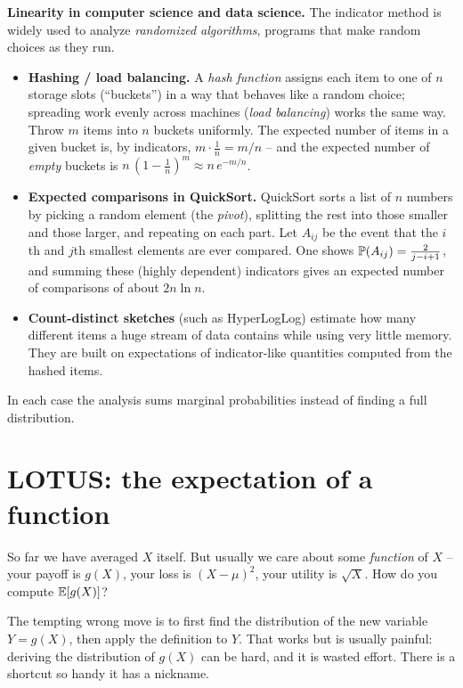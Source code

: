 \begin{applicationbox}
\textbf{Linearity in computer science and data science.} The indicator method is
widely used to analyze \emph{randomized algorithms}, programs that make random
choices as they run.
\begin{itemize}
  \item \textbf{Hashing / load balancing.} A \emph{hash function} assigns each
  item to one of $n$ storage slots (``buckets'') in a way that behaves like a
  random choice; spreading work evenly across machines (\emph{load balancing})
  works the same way. Throw $m$ items into $n$ buckets
  uniformly. The expected number of items in a given bucket is, by indicators,
  $m\cdot \tfrac1n = m/n$ -- and the expected number of \emph{empty} buckets is
  $n\,(1-\tfrac1n)^m \approx n\,e^{-m/n}$.
  \item \textbf{Expected comparisons in QuickSort.} QuickSort sorts a list of
  $n$ numbers by picking a random element (the \emph{pivot}), splitting the rest
  into those smaller and those larger, and repeating on each part. Let $A_{ij}$
  be the event that the $i$th and $j$th smallest elements are ever compared. One
  shows $\P(A_{ij}) = \tfrac{2}{j-i+1}$, and summing these (highly dependent)
  indicators gives an expected number of comparisons of about $2n\ln n$.
  \item \textbf{Count-distinct sketches} (such as HyperLogLog) estimate how many
  different items a huge stream of data contains while using very little memory.
  They are built on expectations of indicator-like quantities computed from the
  hashed items.
\end{itemize}
In each case the analysis sums marginal probabilities instead of finding a full
distribution.
\end{applicationbox}

\section{LOTUS: the expectation of a function}
\label{ch08:lotus}

So far we have averaged $X$ itself. But usually we care about some
\emph{function} of $X$ -- your payoff is $g(X)$, your loss is $(X-\mu)^2$, your
utility is $\sqrt{X}$. How do you compute $\E[g(X)]$?

The tempting wrong move is to first find the distribution of the new variable
$Y = g(X)$, then apply the definition to $Y$. That works but is usually painful:
deriving the distribution of $g(X)$ can be hard, and it is wasted effort. There
is a shortcut so handy it has a nickname.

